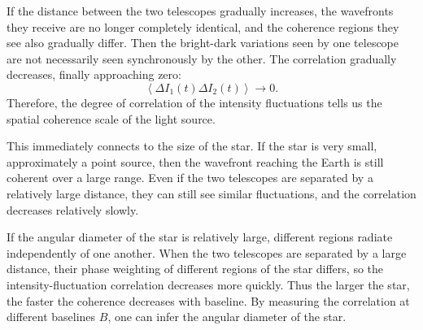 If the distance between the two telescopes gradually increases, the wavefronts they receive are no longer completely identical, and the coherence regions they see also gradually differ. Then the bright-dark variations seen by one telescope are not necessarily seen synchronously by the other. The correlation gradually decreases, finally approaching zero:
\[
  \left\langle \Delta I_1(t)\Delta I_2(t)\right\rangle\rightarrow 0.
\]
Therefore, the degree of correlation of the intensity fluctuations tells us the spatial coherence scale of the light source.

This immediately connects to the size of the star. If the star is very small, approximately a point source, then the wavefront reaching the Earth is still coherent over a large range. Even if the two telescopes are separated by a relatively large distance, they can still see similar fluctuations, and the correlation decreases relatively slowly.

If the angular diameter of the star is relatively large, different regions radiate independently of one another. When the two telescopes are separated by a large distance, their phase weighting of different regions of the star differs, so the intensity-fluctuation correlation decreases more quickly. Thus the larger the star, the faster the coherence decreases with baseline. By measuring the correlation at different baselines \(B\), one can infer the angular diameter of the star.

